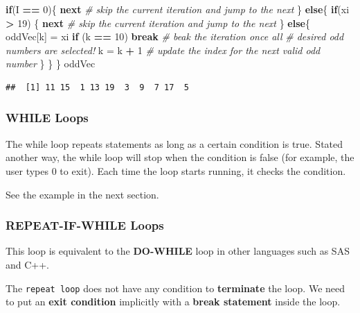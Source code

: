 \documentclass[
]{book}
\newenvironment{Shaded}{\begin{snugshade}}{\end{snugshade}}
\newcommand{\CommentTok}[1]{\textcolor[rgb]{0.56,0.35,0.01}{\textit{#1}}}
\newcommand{\ControlFlowTok}[1]{\textcolor[rgb]{0.13,0.29,0.53}{\textbf{#1}}}
\newcommand{\DecValTok}[1]{\textcolor[rgb]{0.00,0.00,0.81}{#1}}
\newcommand{\NormalTok}[1]{#1}
\newcommand{\OtherTok}[1]{\textcolor[rgb]{0.56,0.35,0.01}{#1}}
\newcommand{\SpecialCharTok}[1]{\textcolor[rgb]{0.81,0.36,0.00}{\textbf{#1}}}
\begin{document}
\begin{Shaded}
\begin{Highlighting}[]
     \ControlFlowTok{if}\NormalTok{(I }\SpecialCharTok{==} \DecValTok{0}\NormalTok{)\{}
         \ControlFlowTok{next}            \CommentTok{\# skip the current iteration and jump to the next}
\NormalTok{     \} }\ControlFlowTok{else}\NormalTok{\{}
        \ControlFlowTok{if}\NormalTok{(xi }\SpecialCharTok{\textgreater{}} \DecValTok{19}\NormalTok{) \{}
           \ControlFlowTok{next}          \CommentTok{\# skip the current iteration and jump to the next}
\NormalTok{       \} }\ControlFlowTok{else}\NormalTok{\{}
\NormalTok{           oddVec[k] }\OtherTok{=}\NormalTok{ xi}
           \ControlFlowTok{if}\NormalTok{ (k }\SpecialCharTok{==} \DecValTok{10}\NormalTok{) }\ControlFlowTok{break}    \CommentTok{\# beak the iteration once all }
                                 \CommentTok{\# desired odd numbers are selected!}
\NormalTok{           k }\OtherTok{=}\NormalTok{ k }\SpecialCharTok{+} \DecValTok{1}             \CommentTok{\# update the index for the next valid odd number}
\NormalTok{       \}}
\NormalTok{     \}}
\NormalTok{  \}}
\NormalTok{oddVec}
\end{Highlighting}
\end{Shaded}

\begin{verbatim}
##  [1] 11 15  1 13 19  3  9  7 17  5
\end{verbatim}

\hypertarget{while-loops}{%
\subsubsection{WHILE Loops}\label{while-loops}}

The while loop repeats statements as long as a certain condition is true. Stated another way, the while loop will stop when the condition is false (for example, the user types 0 to exit). Each time the loop starts running, it checks the condition.

See the example in the next section.

\hypertarget{repeat-if-while-loops}{%
\subsubsection{REPEAT-IF-WHILE Loops}\label{repeat-if-while-loops}}

This loop is equivalent to the \textbf{DO-WHILE} loop in other languages such as SAS and
C++.

The \texttt{repeat\ loop} does not have any condition to \textbf{terminate} the loop. We need to put an \textbf{exit condition} implicitly with a \textbf{break statement} inside the loop.
\end{document}
